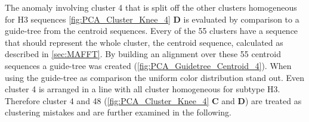 The anomaly involving cluster 4 that is split off the other clusters homogeneous for H3 sequences \autoref{fig:PCA_Cluster_Knee_4} \textbf{\textsf{D}} is evaluated by comparison to a guide-tree from the centroid sequences. Every of the 55 clusters have a sequence that should represent the whole cluster, the centroid sequence, calculated as described in \autoref{sec:MAFFT}. By building an alignment over these 55 centroid sequences a guide-tree was created (\autoref{fig:PCA_Guidetree_Centroid_4}). When using the guide-tree as comparison the uniform color distribution stand out. Even cluster 4 is arranged in a line with all cluster homogeneous for subtype H3. Therefore cluster 4 and 48 (\autoref{fig:PCA_Cluster_Knee_4} \textbf{\textsf{C}} and \textbf{\textsf{D}}) are treated as clustering mistakes and are further examined in the following.

